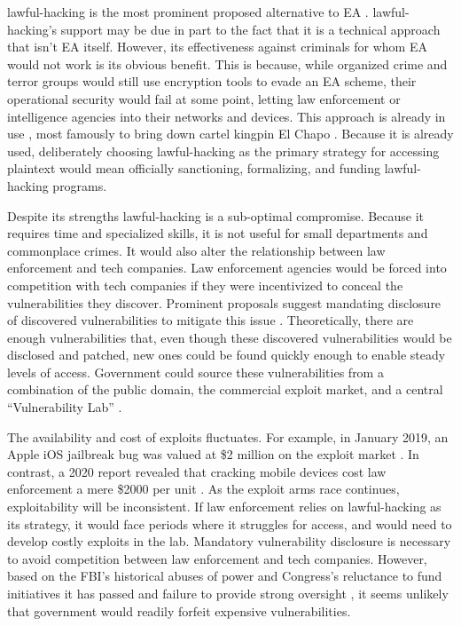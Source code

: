 \Ac{lawful-hacking} is the most prominent proposed alternative to \ac{EA} \cite{bellovin_lawful_2013}
\cite{hennessey_lawful_2016} \cite{rozenshtein_wicked_2018} \cite{kerr_encryption_2017} \cite{soesanto_2018}.
\Ac{lawful-hacking}'s support may be due in part to the fact that it is a technical approach that isn't \ac{EA} itself.
However, its effectiveness against criminals for whom \ac{EA} would not work is its obvious benefit. This is because,
while organized crime and terror groups would still use encryption tools to evade an \ac{EA} scheme, their operational
security would fail at some point, letting law enforcement or intelligence agencies into their networks and devices.
This approach is already in use \cite{cox_2020}, most famously to bring down cartel kingpin El Chapo
\cite{feuer_chapo_2019}. Because it is already used, deliberately choosing \ac{lawful-hacking} as the primary strategy
for accessing plaintext would mean officially sanctioning, formalizing, and funding \ac{lawful-hacking} programs.

Despite its strengths \ac{lawful-hacking} is a sub-optimal compromise. Because it requires time and specialized skills,
it is not useful for small departments and commonplace crimes. It would also alter the relationship between law
enforcement and tech companies. Law enforcement agencies would be forced into competition with tech companies if they
were incentivized to conceal the vulnerabilities they discover. Prominent proposals suggest mandating disclosure of
discovered vulnerabilities to mitigate this issue \cite{bellovin_lawful_2013} \cite{hennessey_lawful_2016}.
Theoretically, there are enough vulnerabilities that, even though these discovered vulnerabilities would be disclosed and
patched, new ones could be found quickly enough to enable steady levels of access. Government could source these
vulnerabilities from a combination of the public domain, the commercial exploit market, and a central ``Vulnerability
Lab'' \cite{bellovin_lawful_2013}.

The availability and cost of exploits fluctuates. For example, in January 2019, an Apple iOS jailbreak bug was valued at
\$2 million on the exploit market \cite{goodin_zeroday_2019}. In contrast, a 2020 report revealed that cracking mobile
devices cost law enforcement a mere \$2000 per unit \cite{koepke_2020}. As the exploit arms race continues,
exploitability will be inconsistent. If law enforcement relies on \ac{lawful-hacking} as its strategy, it would face
periods where it struggles for access, and would need to develop costly exploits in the lab. Mandatory vulnerability
disclosure is necessary to avoid competition between law enforcement and tech companies. However, based on the
\ac{FBI}'s historical abuses of power \cite{shamsi_2011} and Congress's reluctance to fund initiatives it has passed
\cite{keller_internet_2019} and failure to provide strong oversight \cite{johnson_congressional_2004}, it seems unlikely
that government would readily forfeit expensive vulnerabilities.

